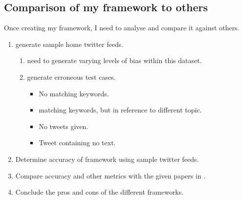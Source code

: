 \documentclass[a4paper,fleqn,10pt]{article}
\begin{document}
\subsection{Comparison of my framework to others}
Once creating my framework, I need to analyse and compare it against others.

\begin{enumerate}
    \item generate sample home twitter feeds.
    \begin{enumerate}
        \item need to generate varying levels of bias within this dataset.
        \item generate erroneous test cases.
        \begin{itemize}
            \item No matching keywords.
            \item matching keywords, but in reference to different topic.
            \item No tweets given.
            \item Tweet containing no text.
        \end{itemize}
    \end{enumerate}
    \item Determine accuracy of framework using sample twitter feeds.
    \item Compare accuracy and other metrics with the given papers in .
    \item Conclude the pros and cons of the different frameworks.
\end{enumerate}
\end{document}
